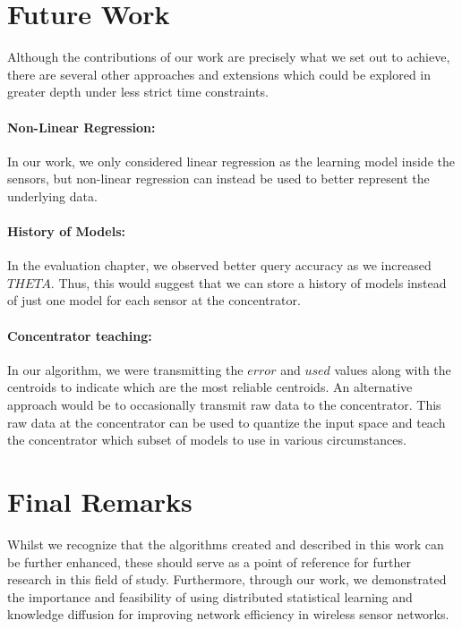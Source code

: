 \documentclass{mproj}
\begin{document}
\section{Future Work}
Although the contributions of our work are precisely what we set out to achieve, there are several other approaches and extensions which could be explored in greater depth under less strict time constraints.

\paragraph{Non-Linear Regression:}In our work, we only considered linear regression as the learning model inside the sensors, but non-linear regression can instead be used to better represent the underlying data. 
\paragraph{History of Models:}In the evaluation chapter, we observed better query accuracy as we increased $THETA$. Thus, this would suggest that we can store a history of models instead of just one model for each sensor at the concentrator.
\paragraph{Concentrator teaching:}In our algorithm, we were transmitting the $error$ and $used$ values along with the centroids to indicate which are the most reliable centroids. An alternative approach would be to occasionally transmit raw data to the concentrator. This raw data at the concentrator can be used to quantize the input space and teach the concentrator which subset of models to use in various circumstances.

\section{Final Remarks}
Whilst we recognize that the algorithms created and described in this work can be further enhanced, these should serve as a point of reference for further research in this field of study. Furthermore, through our work, we demonstrated the importance and feasibility of using distributed statistical learning and knowledge diffusion for improving network efficiency in wireless sensor networks.



\end{document}
